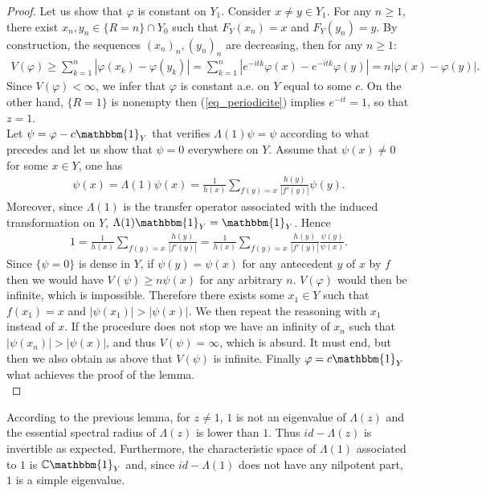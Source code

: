 \documentclass{ws-sd}
\newcommand{\indic}{\mathbbm{1}}
\newcommand{\abs}[1]{\left\lvert #1 \right\rvert}
\begin{document}
{\begin{proof}
Let us show that $\varphi$ is constant on $Y_1$. Consider $x\neq y \in Y_1$. For any $n \ge 1$, there exist $x_n, y_n \in \{ R = n \} \cap Y_0 $ such that $ F_Y(x_n) = x$ and $F_Y(y_n) = y$. By construction, the sequences $(x_n)_n,(y_n)_n$ are decreasing, then for any $n \ge 1$:
\begin{align*}
    V(\varphi)
    \ge \sum_{k=1}^n \abs{\varphi(x_k)-\varphi(y_k)}
    = \sum_{k=1}^{n} \abs{e^{-itk}\varphi(x) - e^{-itk}\varphi(y)}
    = n\abs{\varphi(x)-\varphi(y)}.
 \end{align*}
 Since $V(\varphi) < \infty$, we infer that $\varphi$ is constant a.e. on $Y$ equal to some $c$. On the other hand, $\{ R = 1 \}$ is nonempty then (\ref{eq_periodicite}) implies $e^{-it} = 1$, so that $z =1$. \\
Let $\psi = \varphi-c\indic_Y$ that verifies $\Lambda(1)\psi = \psi$ according to what precedes and let us show that $\psi = 0$ everywhere on $Y$.
Assume that $\psi(x) \neq 0$ for some $x \in Y$, one has
\begin{align*}
    \psi(x) = \Lambda(1)\psi(x) = \frac{1}{h(x)}\sum_{f(y) = x} \frac{h(y)}{\abs{f'(y)}}\psi(y).
\end{align*}
Moreover, since $\Lambda(1)$ is the transfer operator associated with the induced transformation on $Y$, $\Lambda(1)\indic_{Y} = \indic_{Y}$. Hence
\begin{align*}
1 = \frac{1}{h(x)}\sum_{f(y) = x}\frac{h(y)}{\abs{f'(y)}}  = \frac{1}{h(x)}\sum_{f(y) = x}\frac{h(y)}{\abs{f'(y)}}\frac{\psi(y)}{\psi(x)}.
\end{align*}
Since $\{ \psi = 0 \}$ is dense in $Y$, if $ \psi(y) =\psi(x)$ for any antecedent $y$ of $x$ by $f$ then we would have $V(\psi) \ge n\psi(x)$ for any arbitrary $n$. $V(\varphi)$ would then be infinite, which is impossible.
Therefore there exists some $x_1 \in Y$ such that $f(x_1) = x$ and $\abs{\psi(x_1)} > \abs{\psi(x)}$. We then repeat the reasoning with $x_1$ instead of $x$. If the procedure does not stop we have an infinity of $x_n$ such that $\abs{\psi(x_n)} > \abs{\psi(x)}$, and thus $V(\psi) = \infty$, which is absurd. It must end, but then we also obtain as above that $V(\psi)$ is infinite. Finally $\varphi = c\indic_{Y}$ what achieves the proof of the lemma.
\\
\end{proof}
According to the previous lemma, for $z \neq 1$, $1$ is not an eigenvalue of $\Lambda(z)$ and the essential spectral radius of $\Lambda(z)$ is lower than $1$. Thus $id-\Lambda(z)$ is invertible as expected.
Furthermore, the characteristic space of $\Lambda(1)$ associated to $1$ is $\mathbb{C}\indic_Y$ and, since $id - \Lambda(1)$ does not have any nilpotent part, $1$ is a simple eigenvalue.
}
\end{document}
